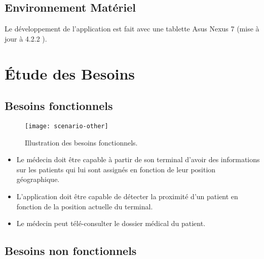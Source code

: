 
\subsection{Environnement Matériel}

Le développement de l'application est fait avec une tablette Asus Nexus 7 (mise à jour à \android{} 4.2.2 ).


\section{Étude des Besoins}

\subsection{Besoins fonctionnels}

\begin{figure}[H]
\center
\texttt{[image: scenario-other]}
\caption{Illustration des besoins fonctionnels.}
\end{figure}

\begin{itemize}

\item Le médecin doit être capable à partir de son terminal d’avoir des
informations sur les patients qui lui sont assignés en fonction de leur position
géographique.

\item L'application doit être capable de détecter la proximité d'un
patient en fonction de la position actuelle du terminal.

\item Le médecin peut télé-consulter le dossier médical du patient.

\end{itemize}

\subsection{Besoins non fonctionnels}


